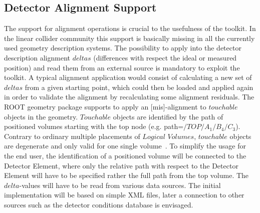 \subsection{Detector Alignment Support}
\label{subsect:alignment-support}
\noindent
The support for alignment operations is crucial to the usefulness of the
toolkit. In the linear collider community this support is basically missing 
in all the currently used geometry description systems.
The possibility to apply into the detector description alignment $deltas$ 
(differences with respect the ideal or measured position) and read them 
from an external source is mandatory to exploit the toolkit. A typical 
alignment application would consist of calculating a new set of $deltas$
from a given starting point, which could then be loaded and applied again 
in order to validate the alignment by recalculating some alignment residuals.
The ROOT geometry package supports to apply an [mis]-alignment to 
$touchable$ objects in the geometry. $Touchable$ objects are identified 
by the path of positioned volumes starting with the top node 
(e.g. path=$/TOP/A_1/B_4/C_3$). Contrary to ordinary multiple placements
of $Logical$ $Volumes$, $touchable$ objects are degenerate and only 
valid for one single volume~\cite{bib:ROOT-tgeo}. 
To simplify the usage for the end user,
the identification of a positioned volume will be connected
to the Detector Element, where only the relative path with respect 
to the Detector Element will have to be specified 
rather the full path from the top volume.
The $delta$-values will have to be read from various data sources.
The initial implementation will be based on simple XML files, later
a connection to other sources such as the detector conditions database
is envisaged.

